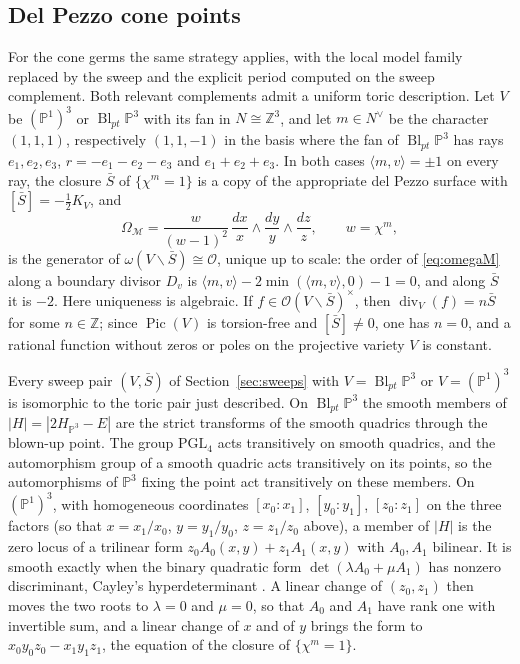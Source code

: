 \documentclass[11pt]{amsart}
\theoremstyle{definition}
\theoremstyle{remark}
\theoremstyle{plain}
\newcommand{\ZZ}{\mathbb{Z}}
\newcommand{\PP}{\mathbb{P}}
\newcommand{\cO}{\mathcal{O}}
\newcommand{\Mil}{\mathcal{M}}  %
\newcommand{\Pic}{\operatorname{Pic}}
\newcommand{\Bl}{\operatorname{Bl}}
\newcommand{\Sb}{\bar{S}}
\begin{document}
\subsection{Del Pezzo cone points}\label{sec:dpperiod}
For the cone germs the same strategy applies, with the local model
family replaced by the sweep and the explicit period computed on the
sweep complement.  Both relevant complements admit a uniform toric
description.  Let $V$ be $(\PP^1)^3$ or $\Bl_{pt}\PP^3$ with its fan
in $N\cong\ZZ^3$, and let $m\in N^{\vee}$ be the character $(1,1,1)$,
respectively $(1,1,-1)$ in the basis where the fan of
$\Bl_{pt}\PP^3$ has rays $e_1,e_2,e_3$, $r=-e_1-e_2-e_3$ and
$e_1+e_2+e_3$.  In both cases $\langle m,v\rangle=\pm1$ on every ray,
the closure $\Sb$ of $\{\chi^m=1\}$ is a copy of the appropriate del
Pezzo surface with $[\Sb]=-\tfrac12K_V$, and
\begin{equation}\label{eq:omegaM}
\Omega_\Mil=\frac{w}{(w-1)^2}\,
\frac{dx}{x}\wedge\frac{dy}{y}\wedge\frac{dz}{z},
\qquad w=\chi^m,
\end{equation}
is the generator of $\omega(V\smallsetminus\Sb)\cong\cO$, unique up to
scale: the order of \eqref{eq:omegaM} along a boundary divisor $D_v$
is $\langle m,v\rangle-2\min(\langle m,v\rangle,0)-1=0$, and along
$\Sb$ it is $-2$.  Here uniqueness is algebraic.  If
$f\in\cO(V\smallsetminus\Sb)^\times$, then
$\operatorname{div}_V(f)=n\Sb$ for some $n\in\ZZ$; since
$\Pic(V)$ is torsion-free and $[\Sb]\neq0$, one has $n=0$, and a
rational function without zeros or poles on the projective variety
$V$ is constant.

Every sweep pair $(V,\Sb)$ of Section~\ref{sec:sweeps} with $V=\Bl_{pt}\PP^3$
or $V=(\PP^1)^3$ is isomorphic to the toric pair just described.  On
$\Bl_{pt}\PP^3$ the smooth members of $|H|=|2H_{\PP^3}-E|$ are the strict
transforms of the smooth quadrics through the blown-up point.  The group
$\mathrm{PGL}_4$ acts transitively on smooth quadrics, and the automorphism
group of a smooth quadric acts transitively on its points, so the
automorphisms of $\PP^3$ fixing the point act transitively on these members.
On $(\PP^1)^3$, with homogeneous coordinates $[x_0:x_1]$, $[y_0:y_1]$,
$[z_0:z_1]$ on the three factors (so that $x=x_1/x_0$, $y=y_1/y_0$,
$z=z_1/z_0$ above), a member of $|H|$ is the zero locus of a trilinear form
$z_0A_0(x,y)+z_1A_1(x,y)$ with $A_0,A_1$ bilinear.  It is smooth exactly when
the binary quadratic form $\det(\lambda A_0+\mu A_1)$ has nonzero
discriminant, Cayley's hyperdeterminant \cite[Chapter~14, \S\S1 and~4]{GKZ94}.  A linear
change of $(z_0,z_1)$ then moves the two roots to $\lambda=0$ and $\mu=0$, so
that $A_0$ and $A_1$ have rank one with invertible sum, and a linear change
of $x$ and of $y$ brings the form to $x_0y_0z_0-x_1y_1z_1$, the equation of
the closure of $\{\chi^m=1\}$.
\end{document}
